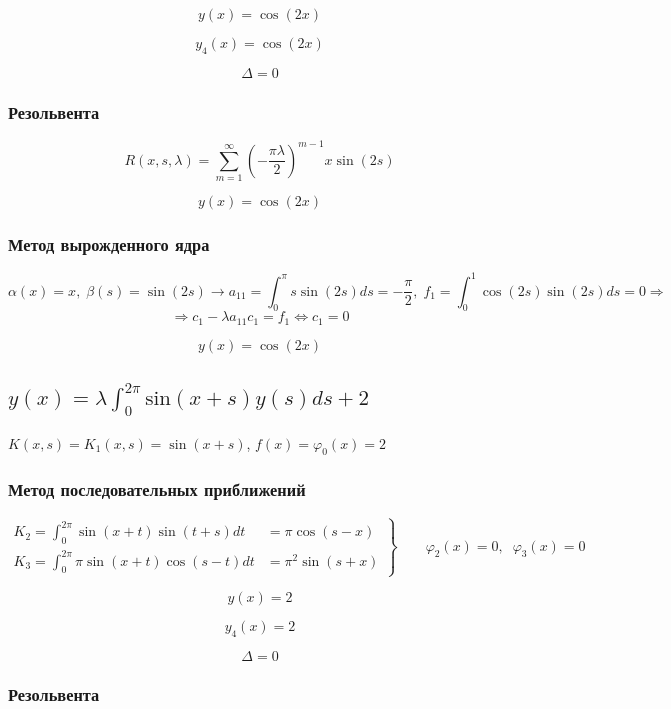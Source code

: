 \documentclass[
11pt,
master, %
subf, %
href, %
colorlinks=true, %
times, %
]{disser}
\begin{document}
$$y(x) = \cos(2x)$$

$$y_4(x) = \cos(2x)$$

$$\Delta = 0$$

\subsubsection{Резольвента}

$$R(x,s,\lambda) = \sum_{m=1}^{\infty} \left(-\frac{\pi \lambda}{2}\right)^{m-1} x \sin(2s)$$

$$y(x) = \cos(2x)$$

\subsubsection{Метод вырожденного ядра}

$$\alpha(x) = x,\;\beta(s) = \sin(2s) \rightarrow a_{11} = \int_{0}^{\pi} s \sin(2s) ds = -\frac{\pi}{2}, \; f_1 = \int_{0}^{1} \cos(2s) \sin(2s) ds = 0 \Rightarrow$$
$$\Rightarrow c_1 - \lambda a_{11} c_1 = f_1 \Longleftrightarrow c_1 = 0$$

$$y(x) = \cos(2x)$$

\subsection{$\displaystyle y(x) = \lambda \int_{0}^{2\pi} \mathrm{sin} (x+s) y(s)ds + 2$}

$K(x,s) = K_1(x,s) = \sin(x+s)$, $f(x)= \varphi_0(x) = 2$

\subsubsection{Метод последовательных приближений}

\begin{equation}
 \left.\begin{aligned}
        K_2 = \int_{0}^{2\pi} \sin(x+t) \sin(t+s) dt &= \pi \cos(s-x)\\
        K_3 = \int_{0}^{2\pi} \pi \sin(x+t) \cos(s-t) dt &= \pi^2 \sin(s+x)
       \end{aligned}
 \right\}
 \qquad \varphi_2(x) =0, \;\; \varphi_3(x) = 0
\end{equation}

$$y(x) = 2$$

$$y_4(x) = 2$$

$$\Delta = 0$$


\subsubsection{Резольвента}
\end{document}
